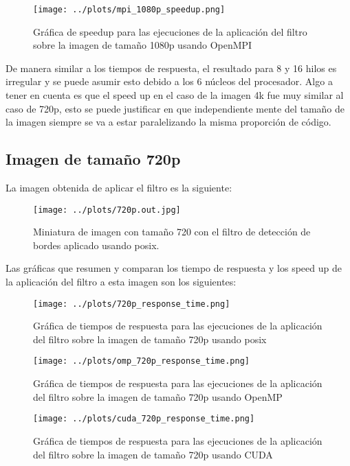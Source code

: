 \begin{figure}[H]
    \centering
    \texttt{[image: ../plots/mpi\_1080p\_speedup.png]}
    \caption{Gráfica de speedup para las ejecuciones de la aplicación del filtro sobre la imagen de tamaño 1080p usando OpenMPI}
\end{figure}

De manera similar a los tiempos de respuesta, el resultado para 8 y 16 hilos es irregular y se puede asumir esto debido a los 6 núcleos del procesador. Algo a tener en cuenta es que el speed up en el caso de la imagen 4k fue muy similar al caso de 720p, esto se puede justificar en que independiente mente del tamaño de la imagen siempre se va a estar paralelizando la misma proporción de código.

\subsection{Imagen de tamaño 720p}

La imagen obtenida de aplicar el filtro es la siguiente:

\begin{figure}[H]
    \centering
    \texttt{[image: ../plots/720p.out.jpg]}
    \caption{Miniatura de imagen con tamaño 720 con el filtro de detección de bordes aplicado usando posix.}
\end{figure}

Las gráficas que resumen y comparan los tiempo de respuesta y los speed up de la aplicación del filtro a esta imagen son los siguientes:

\begin{figure}[H]
    \centering
    \texttt{[image: ../plots/720p\_response\_time.png]}
    \caption{Gráfica de tiempos de respuesta para las ejecuciones de la aplicación del filtro sobre la imagen de tamaño 720p usando posix}
\end{figure}

\begin{figure}[H]
    \centering
    \texttt{[image: ../plots/omp\_720p\_response\_time.png]}
    \caption{Gráfica de tiempos de respuesta para las ejecuciones de la aplicación del filtro sobre la imagen de tamaño 720p usando OpenMP}
\end{figure}

\begin{figure}[H]
    \centering
    \texttt{[image: ../plots/cuda\_720p\_response\_time.png]}
    \caption{Gráfica de tiempos de respuesta para las ejecuciones de la aplicación del filtro sobre la imagen de tamaño 720p usando CUDA}
\end{figure}

